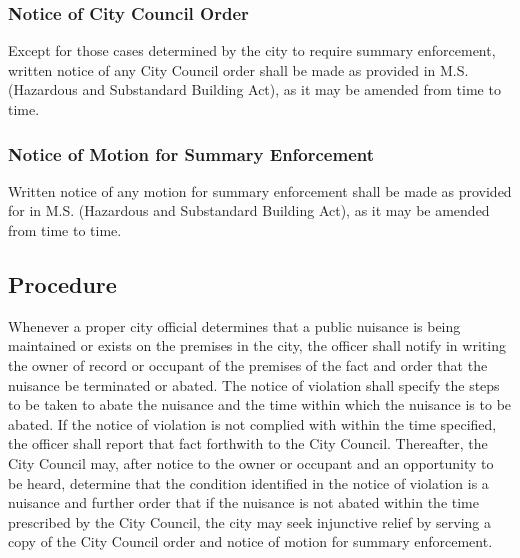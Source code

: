 \subsubsection{Notice of City Council Order}
Except for those cases determined by the city to require summary enforcement, written notice of any City Council order shall be made as provided in M.S.  (Hazardous and Substandard Building Act), as it may be amended from time to time.
\subsubsection{Notice of Motion for Summary Enforcement}
Written notice of any motion for summary enforcement shall be made as provided for in M.S.  (Hazardous and Substandard Building Act), as it may be amended from time to time.
\subsection{Procedure}
Whenever a proper city official determines that a public nuisance is being maintained or exists on the premises in the city, the officer shall notify in writing the owner of record or occupant of the premises of the fact and order that the nuisance be terminated or abated.  The notice of violation shall specify the steps to be taken to abate the nuisance and the time within which the nuisance is to be abated.  If the notice of violation is not complied with within the time specified, the officer shall report that fact forthwith to the City Council.  Thereafter, the City Council may, after notice to the owner or occupant and an opportunity to be heard, determine that the condition identified in the notice of violation is a nuisance and further order that if the nuisance is not abated within the time prescribed by the City Council, the city may seek injunctive relief by serving a copy of the City Council order and notice of motion for summary enforcement.
